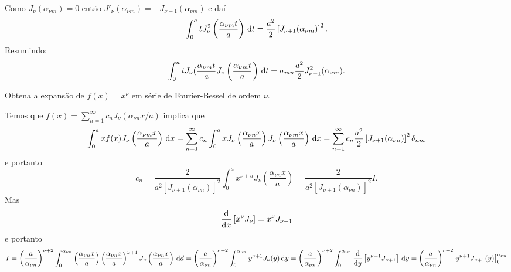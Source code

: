 Como $J_{\nu}(\alpha_{\nu m}) = 0$ então $J'_{\nu}(\alpha_{\nu m}) = -J_{\nu +
1}(\alpha_{\nu m})$ e daí
\begin{dmath*}
  \int_0^a t J_{\nu}^2\left( \frac{\alpha_{\nu m} t}{a} \right) \vi{t} =
  \frac{a^2}{2} \left[ J_{\nu + 1}(\alpha_{\nu m}) \right]^2.
\end{dmath*}
Resumindo:
\begin{dmath*}
  \int_0^a t J_\nu(\frac{\alpha_{\nu m} t}{a} J_{\nu}\left(
  \frac{\alpha_{\nu m} t}{a} \right) \vi{t} = \sigma_{mn} \frac{a^2}{2} J_{\nu +
  1}^2(\alpha_{\nu m}).
\end{dmath*}

\begin{exem}
  Obtena a expansão de $f(x) = x^{\nu}$ em série de Fourier-Bessel de ordem
  $\nu$.

  Temos que $f(x) = \sum_{n = 1}^{\infty} c_n J_{\nu} (\alpha_{\nu n} x / a)$
  implica que
  \begin{dmath*}
    \int_0^a x f(x) J_{\nu} \left( \frac{\alpha_{\nu m} x}{a} \right) \vi{x} =
    \sum_{n = 1}^{\infty} c_n \int_0^a x J_{\nu} \left( \frac{\alpha_{\nu n}
    x}{a} \right) J_{\nu}\left( \frac{\alpha_{\nu m} x}{a} \right) \vi{x}
    = \sum_{n = 1}^{\infty} c_n \frac{a^2}{2} \left[ J_{\nu + 1}(\alpha_{\nu n})
    \right]^2 \delta_{nm}
  \end{dmath*}
  e portanto
  \begin{dmath*}
    c_n = \frac{2}{a^2 \left[ J_{\nu + 1}(\alpha_{\nu n}) \right]^2} \int_0^a
    x^{\nu + a} J_{\nu}\left( \frac{\alpha_{\nu n} x}{a} \right)
    = \frac{2}{a^2 \left[ J_{\nu + 1}(\alpha_{\nu n}) \right]^2} I.
  \end{dmath*}
  Mas
  \begin{dmath*}
    \fder{}{x} \left[ x^{\nu} J_{\nu} \right] = x^{\nu} J_{\nu - 1}
  \end{dmath*}
  e portanto
  \begin{dmath*}
    I = \left( \frac{a}{\alpha_{\nu n}} \right)^{\nu + 2} \int_0^{\alpha_{\nu
    n}} \left( \frac{\alpha_{\nu n} x}{a} \right) \left( \frac{\alpha_{\nu n}
    x}{a} \right)^{\nu + 1} J_{\nu}\left( \frac{\alpha_{\nu n} x}{a} \right)
    \vi{d}
    = \left( \frac{a}{\alpha_{\nu n}} \right)^{\nu + 2} \int_0^{\alpha_{\nu n}}
    y^{\nu + 1} J_{\nu}(y) \vi{y}
    = \left( \frac{a}{\alpha_{\nu n}} \right)^{\nu + 2} \int_0^{\alpha_{\nu n}}
    \fder{}{y} \left[ y^{\nu + 1} J_{\nu + 1} \right] \vi{y}
    = \left( \frac{a}{\alpha_{\nu n}} \right)^{\nu + 2} \left. y^{\nu + 1}
    J_{\nu + 1}(y) \right|_{0}^{\alpha_{\nu n}}

\end{dmath*}
\end{exem}
